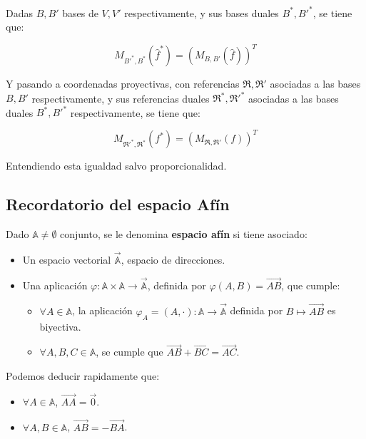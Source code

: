 Dadas $B, B'$ bases de $V, V'$ respectivamente, y sus bases duales $B^*, B'^*$, se tiene que:

\[
    M_{B'^*, B^*}(\hat{f}^*) = (M_{B, B'}(\hat{f}))^T
\]

Y pasando a coordenadas proyectivas, con referencias $\mathfrak{R}, \mathfrak{R}'$ asociadas a las bases $B, B'$ respectivamente, y sus referencias duales $\mathfrak{R}^*, \mathfrak{R}'^*$ asociadas a las bases duales $B^*, B'^*$ respectivamente, se tiene que:

\[
    M_{\mathfrak{R}'^*, \mathfrak{R}^*}(f^*) =
    (M_{\mathfrak{R}, \mathfrak{R}'}(f))^T
\]

Entendiendo esta igualdad salvo proporcionalidad.

\subsection{Recordatorio del espacio Afín}

\begin{definición}
    Dado $\mathbb{A} \neq \emptyset$ conjunto, se le denomina \textbf{espacio afín} si tiene asociado:
    \begin{itemize}
        \item Un espacio vectorial $\vec{\mathbb{A}}$, espacio de direcciones.
        \item Una aplicación $\varphi: \mathbb{A} \times \mathbb{A} \to \vec{\mathbb{A}}$, definida por $\varphi(A, B) = \overrightarrow{AB}$, que cumple:
        \begin{itemize}
            \item $\forall A \in \mathbb{A}$, la aplicación $\varphi_A = (A, \cdot): \mathbb{A} \to \vec{\mathbb{A}}$ definida por $B \mapsto \overrightarrow{AB}$ es biyectiva.
            \item $\forall A, B, C \in \mathbb{A}$, se cumple que $\overrightarrow{AB} + \overrightarrow{BC} = \overrightarrow{AC}$.
        \end{itemize}
    \end{itemize}
\end{definición}

\begin{corolario}
    Podemos deducir rapidamente que:
    \begin{itemize}
        \item $\forall A \in \mathbb{A}$, $\overrightarrow{AA} = \vec{0}$.
        \item $\forall A, B \in \mathbb{A}$, $\overrightarrow{AB} = -\overrightarrow{BA}$.
    \end{itemize}
\end{corolario}

